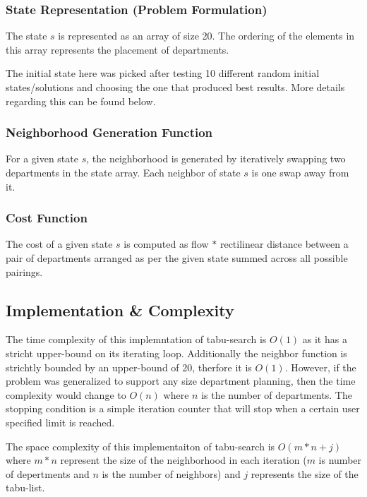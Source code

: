 \documentclass{article}
\begin{document}
\subsubsection{State Representation (Problem Formulation)}

The state $s$ is represented as an array of size 20.
The ordering of the elements in this array represents the placement of departments.

\setlength{\parskip}{6pt}

The initial state here was picked after testing 10 different random initial states/solutions and choosing the one that produced best results.
More details regarding this can be found below.

\subsubsection{Neighborhood Generation Function}

For a given state $s$, the neighborhood is generated by iteratively swapping two departments in the state array.
Each neighbor of state $s$ is one swap away from it.

\subsubsection{Cost Function}

The cost of a given state $s$ is computed as flow $*$ rectilinear distance between a pair of departments arranged as per the given state summed across all possible pairings.

\subsection{Implementation \& Complexity}

The time complexity of this implemntation of tabu-search is $O(1)$ as it has a stricht upper-bound on its iterating loop. Additionally the neighbor function is strichtly bounded by an upper-bound of 20, therfore it is $O(1)$. However, if the problem was generalized to support any size department planning, then the time complexity would change to $O(n)$ where $n$ is the number of departments. The stopping condition is a simple iteration counter that will stop when a certain user specified limit is reached.

The space complexity of this implementaiton of tabu-search is $O(m*n + j)$ where $m*n$ represent the size of the neighborhood in each iteration ($m$ is number of depertments and $n$ is the number of neighbors) and $j$ represents the size of the tabu-list.
\end{document}
